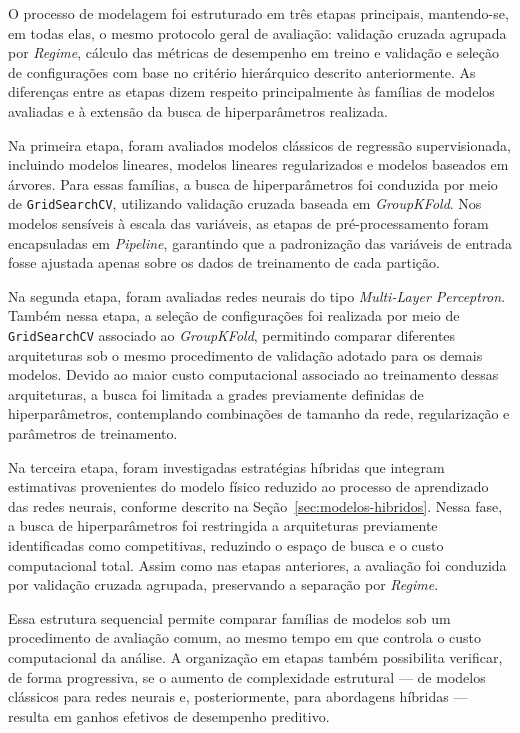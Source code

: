 O processo de modelagem foi estruturado em três etapas principais, mantendo-se, em todas elas, o mesmo protocolo geral de avaliação: validação cruzada agrupada por \textit{Regime}, cálculo das métricas de desempenho em treino e validação e seleção de configurações com base no critério hierárquico descrito anteriormente. As diferenças entre as etapas dizem respeito principalmente às famílias de modelos avaliadas e à extensão da busca de hiperparâmetros realizada.

Na primeira etapa, foram avaliados modelos clássicos de regressão supervisionada, incluindo modelos lineares, modelos lineares regularizados e modelos baseados em árvores. Para essas famílias, a busca de hiperparâmetros foi conduzida por meio de \texttt{GridSearchCV}, utilizando validação cruzada baseada em \textit{GroupKFold}. Nos modelos sensíveis à escala das variáveis, as etapas de pré-processamento foram encapsuladas em \textit{Pipeline}, garantindo que a padronização das variáveis de entrada fosse ajustada apenas sobre os dados de treinamento de cada partição.

Na segunda etapa, foram avaliadas redes neurais do tipo \textit{Multi-Layer Perceptron}. Também nessa etapa, a seleção de configurações foi realizada por meio de \texttt{GridSearchCV} associado ao \textit{GroupKFold}, permitindo comparar diferentes arquiteturas sob o mesmo procedimento de validação adotado para os demais modelos. Devido ao maior custo computacional associado ao treinamento dessas arquiteturas, a busca foi limitada a grades previamente definidas de hiperparâmetros, contemplando combinações de tamanho da rede, regularização e parâmetros de treinamento.

Na terceira etapa, foram investigadas estratégias híbridas que integram estimativas provenientes do modelo físico reduzido ao processo de aprendizado das redes neurais, conforme descrito na Seção~\ref{sec:modelos-hibridos}. Nessa fase, a busca de hiperparâmetros foi restringida a arquiteturas previamente identificadas como competitivas, reduzindo o espaço de busca e o custo computacional total. Assim como nas etapas anteriores, a avaliação foi conduzida por validação cruzada agrupada, preservando a separação por \textit{Regime}.

Essa estrutura sequencial permite comparar famílias de modelos sob um procedimento de avaliação comum, ao mesmo tempo em que controla o custo computacional da análise. A organização em etapas também possibilita verificar, de forma progressiva, se o aumento de complexidade estrutural — de modelos clássicos para redes neurais e, posteriormente, para abordagens híbridas — resulta em ganhos efetivos de desempenho preditivo.
